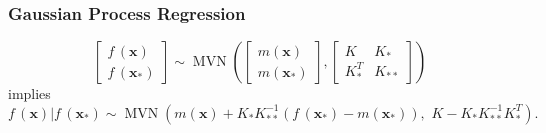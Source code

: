 \documentclass{beamer}
\DeclareMathOperator{\MVN}{MVN}
\begin{document}
\begin{frame}
    \frametitle{Gaussian Process Regression}

    $$
        \begin{bmatrix}
            f\,(\mathbf{x}) \\
            f\,(\mathbf{x}_*)
        \end{bmatrix} \sim \MVN\left(
        \begin{bmatrix}
                m(\mathbf{x}) \\
                m(\mathbf{x}_*)
            \end{bmatrix}, \begin{bmatrix}
                K       & K_{*}  \\
                K_{*}^T & K_{**}
            \end{bmatrix}
        \right)
    $$ implies
    $$
        f\,(\mathbf{x}) | f\,(\mathbf{x}_*)
        \sim \MVN\left(
        m(\mathbf{x}) + K_{*}K_{**}^{-1}(f\,(\mathbf{x}_*) - m(\mathbf{x}_*)), \,\,
        K - K_{*}K_{**}^{-1}K_{*}^T
        \right).
    $$
\end{frame}
\end{document}
